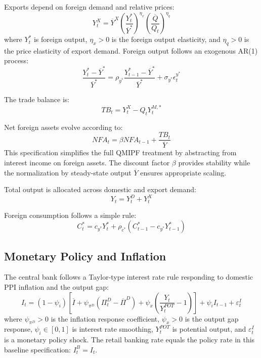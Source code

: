 \documentclass[12pt]{article}
\begin{document}
Exports depend on foreign demand and relative prices:
\begin{equation}
Y_t^X = \overline{Y}^X \left( \frac{Y_t^*}{\overline{Y}^*} \right)^{\eta_x} \left( \frac{\overline{Q}}{Q_t} \right)^{\eta_q}
\end{equation}
where $Y_t^*$ is foreign output, $\eta_x > 0$ is the foreign output elasticity, and $\eta_q > 0$ is the price elasticity of export demand. Foreign output follows an exogenous AR(1) process:
\begin{equation}
\frac{Y_t^* - \overline{Y}^*}{\overline{Y}^*} = \rho_{y^*} \frac{Y_{t-1}^* - \overline{Y}^*}{\overline{Y}^*} + \sigma_{y^*} \epsilon_t^{y^*}
\end{equation}

The trade balance is:
\begin{equation}
TB_t = Y_t^X - Q_t Y_t^{M,*}
\end{equation}

Net foreign assets evolve according to:
\begin{equation}\label{eq:nfa}
NFA_t = \beta NFA_{t-1} + \frac{TB_t}{\overline{Y}}
\end{equation}
This specification simplifies the full QMIPF treatment by abstracting from interest income on foreign assets. The discount factor $\beta$ provides stability while the normalization by steady-state output $\overline{Y}$ ensures appropriate scaling.

Total output is allocated across domestic and export demand:
\begin{equation}
Y_t = Y_t^D + Y_t^X
\end{equation}

Foreign consumption follows a simple rule:
\begin{equation}
C_t^* = c_{y^*} Y_t^* + \rho_{c^*} (C_{t-1}^* - c_{y^*} Y_{t-1}^*)
\end{equation}

\subsection{Monetary Policy and Inflation}

The central bank follows a Taylor-type interest rate rule responding to domestic PPI inflation and the output gap:
\begin{equation}\label{eq:taylor}
I_t = (1-\psi_i) \left[ \overline{I} + \psi_{\pi^D} (\Pi_t^D - \overline{\Pi}^D) + \psi_x \left( \frac{Y_t}{Y_t^{POT}} - 1 \right) \right] + \psi_i I_{t-1} + \varepsilon_t^I
\end{equation}
where $\psi_{\pi^D} > 0$ is the inflation response coefficient, $\psi_x > 0$ is the output gap response, $\psi_i \in [0,1]$ is interest rate smoothing, $Y_t^{POT}$ is potential output, and $\varepsilon_t^I$ is a monetary policy shock. The retail banking rate equals the policy rate in this baseline specification: $I_t^B = I_t$.
\end{document}
